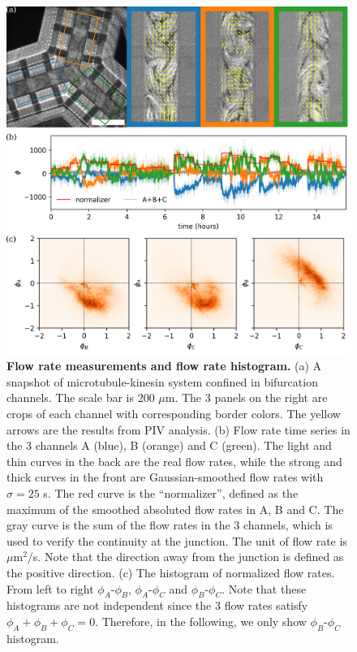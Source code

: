 \documentclass[%
10pt,
superscriptaddress,
twocolumn,
 amsmath,amssymb,
 aps,prx,
]{revtex4-2}
\begin{document}
\begin{figure}[!h]
    \includegraphics[width=\textwidth]{3-bifurcation-symmetric}
    \caption{
    \textbf{Flow rate measurements and flow rate histogram.}
    (a) A snapshot of microtubule-kinesin system confined in bifurcation channels.
    The scale bar is 200 $\mu$m.
    The 3 panels on the right are crops of each channel with corresponding border colors. 
    The yellow arrows are the results from PIV analysis. 
    (b) Flow rate time series in the 3 channels A (blue), B (orange) and C (green). 
    The light and thin curves in the back are the real flow rates, while the strong and thick curves in the front are Gaussian-smoothed flow rates with $\sigma=25$ s. 
    The red curve is the ``normalizer'', defined as the maximum of the   smoothed absoluted flow rates in A, B and C. 
    The gray curve is the sum of the flow rates in the 3 channels, which is used to verify the continuity at the junction.
    The unit of flow rate is $\mu$m$^2$/s.
    Note that the direction away from the junction is defined as the positive direction. 
    (c) The histogram of normalized flow rates. From left to right $\phi_A$-$\phi_B$, $\phi_A$-$\phi_C$ and $\phi_B$-$\phi_C$. Note that these histograms are not independent since the 3 flow rates satisfy $\phi_A+\phi_B+\phi_C = 0$. Therefore, in the following, we only show $\phi_B$-$\phi_C$ histogram.
    }
    \label{fig:bifurcation-symmetric}
\end{figure}
\end{document}
